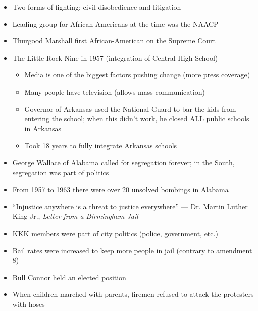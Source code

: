 \documentclass[12pt]{article}
\begin{document}
\begin{itemize}
  \item Two forms of fighting: civil disobedience and litigation

  \item Leading group for African-Americans at the time was the NAACP

  \item Thurgood Marshall first African-American on the Supreme Court

  \item The Little Rock Nine in 1957 (integration of Central High School)

    \begin{itemize}

      \item Media is one of the biggest factors pushing change (more press coverage)

      \item Many people have television (allows mass communication)

      \item Governor of Arkansas used the National Guard to bar the kids from entering the school; when this didn't work, he closed ALL public schools in Arkansas

      \item Took 18 years to fully integrate Arkansas schools

    \end{itemize}

  \item George Wallace of Alabama called for segregation forever; in the South, segregation was part of politics

  \item From 1957 to 1963 there were over 20 unsolved bombings in Alabama

  \item “Injustice anywhere is a threat to justice everywhere” — Dr. Martin Luther King Jr., \textit{Letter from a Birmingham Jail}

  \item KKK members were part of city politics (police, government, etc.)

  \item Bail rates were increased to keep more people in jail (contrary to amendment 8)

  \item Bull Connor held an elected position

  \item When children marched with parents, firemen refused to attack the protesters with hoses

\end{itemize}
\end{document}
